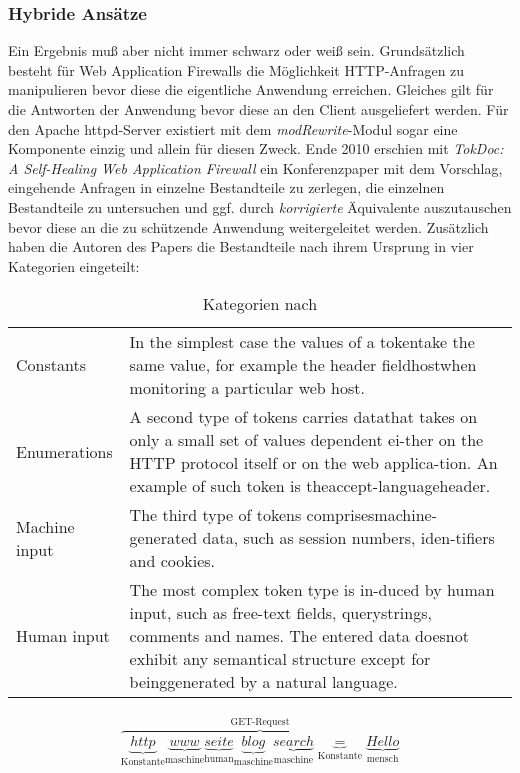 \subsubsection{Hybride Ansätze} %
Ein Ergebnis muß aber nicht immer schwarz oder weiß sein.  Grundsätzlich besteht für Web Application Firewalls die Möglichkeit HTTP-Anfragen zu manipulieren bevor diese die eigentliche Anwendung erreichen. Gleiches gilt für die Antworten der Anwendung bevor diese an den Client ausgeliefert werden. Für den Apache httpd-Server existiert mit dem \emph{modRewrite}-Modul sogar eine Komponente einzig und allein für diesen Zweck. Ende 2010 erschien mit \glqq\emph{TokDoc: A Self-Healing Web Application Firewall}\grqq \cite{Krueger2010} ein Konferenzpaper mit dem Vorschlag, eingehende Anfragen in einzelne Bestandteile zu zerlegen, die einzelnen Bestandteile zu untersuchen und ggf. durch \emph{korrigierte} Äquivalente auszutauschen bevor diese an die zu schützende Anwendung weitergeleitet werden. Zusätzlich haben die Autoren des Papers die Bestandteile nach ihrem Ursprung in vier Kategorien eingeteilt:

\begin{table}[h]
  \centering
  \begin{tabular}{|l | p |}
    \hline
    Constants & In the simplest case the values of a tokentake the same value, for example the header fieldhostwhen monitoring a particular web host. \\
    Enumerations &  A  second  type  of  tokens  carries  datathat takes on only a small set of values dependent ei-ther on the HTTP protocol itself or on the web applica-tion.  An example of such token is theaccept-languageheader.\\
    Machine input & The  third  type  of  tokens  comprisesmachine-generated data, such as session numbers, iden-tifiers and cookies. \\
    Human input & The  most  complex  token  type  is  in-duced by human input, such as free-text fields, querystrings, comments and names.  The entered data doesnot exhibit any semantical structure except for beinggenerated by a natural language.  \\
    \hline
  \end{tabular}
  \caption{Kategorien nach \cite{Krueger2010}}
  \label{tab:tocdoc}
\end{table}

\begin{align}
  \overbrace{
    \underbrace{http}_\text{Konstante} \underbrace{www}_\text{maschine}\underbrace{seite}_\text{human}\underbrace{blog}_\text{maschine}\underbrace{search}_\text{maschine}\underbrace{=}_\text{Konstante}\underbrace{Hello}_\text{mensch}
  }^\text{GET-Request}
\end{align}

